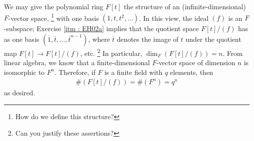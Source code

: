 \documentclass[oneside, english, 11pt]{article}
\newcommand{\order}{\#}
\begin{document}
We may give the polynomial ring $F[t]$ the structure of an (infinite-dimensional) $F$-vector space,%
\footnote{How do we define this structure?} %
with one basis $(1, t, t^{2}, \ldots)$. In this view, the ideal $(f)$ is an $F$-subspace; Exercise \ref{itm : EH02a} implies that the quotient space $F[t] / (f)$ has as one basis $(\overline{1}, \overline{t}, \ldots, \overline{t}^{n - 1})$, where $\overline{t}$ denotes the image of $t$ under the quotient map $F[t] \rightarrow F[t] / (f)$, etc.%
\footnote{Can you justify these assertions?} %
In particular, $\dim_{F} (F[t] / (f)) = n$. From linear algebra, we know that a finite-dimensional $F$-vector space of dimension $n$ is isomorphic to $F^{n}$. Therefore, if $F$ is a finite field with $q$ elements, then
\begin{align*}
\order(F[t] / (f))
=
\order(F^{n})
=
q^{n}
\end{align*}
as desired.%
\end{document}
